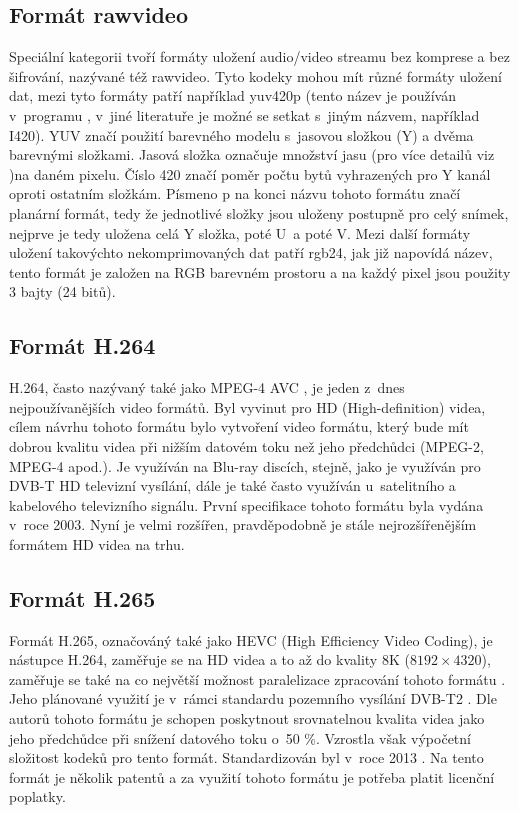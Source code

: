 \documentclass[thesis=M,czech]{FITthesis}[2016/06/26]
\begin{document}
\subsection{Formát rawvideo}
Speciální kategorii tvoří formáty uložení audio/video streamu bez komprese a bez šifrování, nazývané též rawvideo\cite{rawvideo}. Tyto kodeky mohou mít různé formáty uložení dat, mezi tyto formáty patří například yuv420p (tento název je používán v~programu \cite{ffmpeg}, v~jiné literatuře je možné se setkat s~jiným názvem, například I420\cite{yuv}). YUV značí použití barevného modelu s~jasovou složkou (Y) a dvěma barevnými složkami. Jasová složka označuje množství jasu (pro více detailů viz \cite{jas} )na daném pixelu. Číslo 420 značí poměr počtu bytů vyhrazených pro Y kanál oproti ostatním složkám\cite{yuv}. Písmeno p na konci názvu tohoto formátu značí planární formát, tedy že jednotlivé složky jsou uloženy postupně pro celý snímek, nejprve je tedy uložena celá Y složka, poté U~a poté V\cite{yuv}. Mezi další formáty uložení takovýchto nekomprimovaných dat patří rgb24, jak již napovídá název, tento formát je založen na RGB barevném prostoru a na každý pixel jsou použity 3 bajty (24 bitů). 
\subsection{Formát H.264}
H.264, často nazývaný také jako MPEG-4 AVC \cite{h264}, je jeden z~dnes nejpoužívanějších video formátů. Byl vyvinut pro HD (High-definition) videa, cílem návrhu tohoto formátu bylo vytvoření video formátu, který bude mít dobrou kvalitu videa při nižším datovém toku než jeho předchůdci (MPEG-2, MPEG-4 apod.). Je využíván na Blu-ray discích, stejně, jako je využíván pro DVB-T HD televizní vysílání, dále je také často využíván u~satelitního a kabelového televizního signálu. První specifikace tohoto formátu byla vydána v~roce 2003. Nyní je velmi rozšířen, pravděpodobně je stále nejrozšířenějším formátem HD videa na trhu.
\subsection{Formát H.265}
Formát H.265, označováný také jako HEVC (High Efficiency Video Coding), je nástupce H.264, zaměřuje se na HD videa a to až do kvality 8K ($8192\times4320$), zaměřuje se také na co největší možnost paralelizace zpracování tohoto formátu \cite{h265}. Jeho plánované využití je v~rámci standardu pozemního vysílání DVB-T2 \cite{dvbt2}. Dle autorů tohoto formátu je schopen poskytnout srovnatelnou kvalita videa jako jeho předchůdce při snížení datového toku o~50 \%\cite{h265}. Vzrostla však výpočetní složitost kodeků pro tento formát. Standardizován byl v~roce 2013 \cite{h265}. Na tento formát je několik patentů a za využití tohoto formátu je potřeba platit licenční poplatky.
\end{document}
